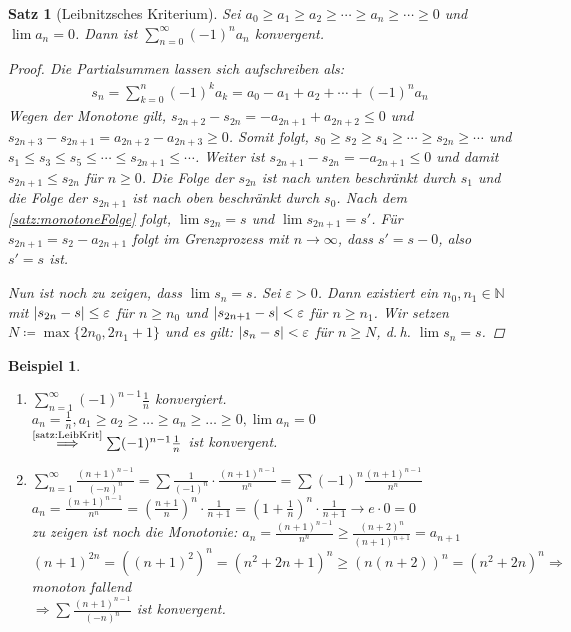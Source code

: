 \documentclass[ngerman,titlepage,twoside, parskip=half*]{scrreprt}
\newcommand*{\N}{\mathbb{N}}
\theoremstyle{break}
\newtheorem{theorem}{Satz}[section]
\theoremstyle{nonumberbreak}
\newtheorem{beispiel}{Beispiel}
\newtheorem{proof}{Beweis:}
\DeclarePairedDelimiter{\abs}{\lvert}{\rvert}
\begin{document}
\begin{theorem}[Leibnitzsches Kriterium]\label{satz:LeibKrit}
  Sei $a_0\geq a_1\geq a_2\geq\dotsb\geq a_n\geq \dotsb\geq 0$ und $\lim
  a_n=0$. Dann ist $\sum_{n=0}^\infty (-1)^na_n$ konvergent.
  \begin{proof}
    Die Partialsummen lassen sich aufschreiben als:
    \begin{gather*}
      s_n=\sum_{k=0}^n (-1)^ka_k=a_0-a_1+a_2+\dotsb +(-1)^na_n
    \end{gather*}
    Wegen der Monotone gilt, $s_{2n+2}- s_{2n}= -a_{2n+1}+a_{2n+2} \leq 0$ und
    $s_{2n+3} -s_{2n+1}= a_{2n+2}-a_{2n+3} \geq 0$. Somit folgt, $s_{0}\geq
    s_{2}\geq s_{4}\geq\dotsb\geq s_{2n}\geq\dotsb$ und $s_{1}\leq s_{3}\leq
    s_{5}\leq\dotsb\leq s_{2n+1}\leq\dotsb$. Weiter ist $s_{2n+1}- s_{2n}=
    -a_{2n+1}\leq0$ und damit $s_{2n+1}\leq s_{2n}$ für $n\geq0$.  Die Folge
    der $s_{2n}$ ist nach unten beschränkt durch $s_{1}$ und die Folge der
    $s_{2n+1}$ ist nach oben beschränkt durch $s_{0}$. Nach dem
    \autoref{satz:monotoneFolge} folgt, $\lim s_{2n} = s$ und $\lim s_{2n+1}
    =s'$. Für $s_{2n+1}= s_{2}-a_{2n+1}$ folgt im Grenzprozess mit
    $n\rightarrow\infty$, dass $s'=s-0$, also $s'=s$ ist.

    Nun ist noch zu zeigen, dass $\lim s_n=s$. Sei $\varepsilon>0$. Dann
    existiert ein $n_0, n_1 \in \N$ mit $\abs{s_{2n}-s} \leq \varepsilon$ für
    $n\geq n_0$ und $\abs{s_{2n+1}-s} < \varepsilon$ für  $n\geq n_1$. Wir
    setzen $N\coloneqq\max\{2n_0,2n_1+1\}$ und es gilt:
    $\abs{s_n-s}<\varepsilon$ für $n\geq N$, d.\,h. $\lim s_n=s$.
  \end{proof}
\end{theorem}

\begin{beispiel}
  \begin{enumerate}
  \item $\sum_{n=1}^\infty (-1)^{n-1}\frac{1}{n}$ konvergiert. $a_n=\frac{1}{n}, a_1\geq a_2\geq \ldots \geq 
    a_n\geq \ldots \geq0, \lim a_n=0$\\
    $\stackrel{\text{\autoref{satz:LeibKrit}}}{\Longrightarrow} \sum (-1)^{n-1}\frac{1}{n}$ ist konvergent.
  \item $\sum_{n=1}^\infty \frac{(n+1)^{n-1}}{(-n)^n}=\sum \frac{1}{(-1)^n}\cdot \frac{(n+1)^{n-1}}{n^n}=\sum (-1)^n
    \frac{(n+1)^{n-1}}{n^n}$\\
    $a_n=\frac{(n+1)^{n-1}}{n^n}=(\frac{n+1}{n})^n\cdot \frac{1}{n+1}=(1+\frac{1}{n})^n\cdot \frac{1}{n+1}\rightarrow e
    \cdot 0=0$\\
    zu zeigen ist noch die Monotonie: $a_n=\frac{(n+1)^{n-1}}{n^n}\geq \frac{(n+2)^n}{(n+1)^{n+1}}=a_{n+1}$\\
    $(n+1)^{2n}=((n+1)^2)^n=(n^2+2n+1)^n\geq (n(n+2))^n=(n^2+2n)^n \Rightarrow$ monoton fallend\\
    $\Rightarrow \sum \frac{(n+1)^{n-1}}{(-n)^n}$ ist konvergent.
\end{enumerate}
\end{beispiel}
\end{document}
